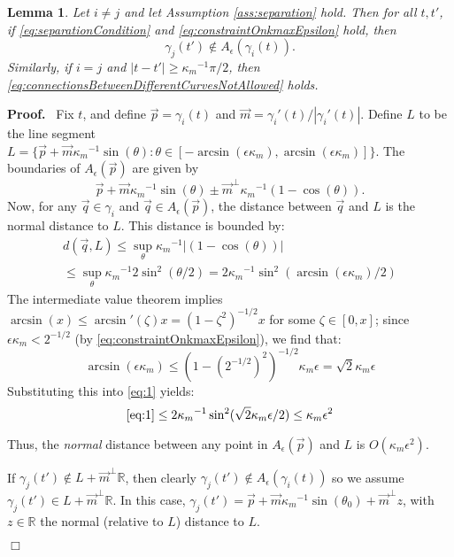\documentclass{article}
\newcommand{\nin}{\not\in}
\newenvironment{proof}{
  \noindent\textbf{Proof.}\ }{\hspace*{\fill}
  \begin{math}\Box\end{math}\medskip}
\newtheorem{lemma}[cntr]{Lemma}
\numberwithin{cntr}{section}
\numberwithin{equation}{section}
\newcommand{\abs}[1]{\left| #1 \right|}%
\newcommand{\RR}[0]{{\mathbb{R}}}
\newcommand{\vp}[0]{{\vec{p}}}
\newcommand{\vq}[0]{{\vec{q}}}
\newcommand{\vm}[0]{{\vec{m}}}
\newcommand{\allowed}[2]{ { A_{#1}(#2) } }
\newcommand{\kmax}{{\kappa_{m}}}
\newcommand{\kmaxi}{{\kmax^{-1}}}
\begin{document}
\begin{lemma}
  \label{lem:separationAllowedRegions}
  Let $i \neq j$ and let Assumption \ref{ass:separation} hold. Then for all $t, t'$, if \eqref{eq:separationCondition} and \eqref{eq:constraintOnkmaxEpsilon} hold, then
  \begin{equation}
    \label{eq:connectionsBetweenDifferentCurvesNotAllowed}
    \gamma_{j}(t')  \nin  \allowed{\epsilon}{\gamma_{i}(t)}.
  \end{equation}
  Similarly, if $i=j$ and $\abs{t-t'} \geq \kmax^{-1} \pi/2$, then \eqref{eq:connectionsBetweenDifferentCurvesNotAllowed} holds.
\end{lemma}
\begin{proof}
  Fix $t$, and define $\vp=\gamma_{i}(t)$ and $\vm=\gamma_{i}'(t) / \abs{\gamma_{i}'(t)}$. Define $L$ to be the line segment $L= \{ \vp+\vm \kmaxi \sin(\theta) : \theta \in [-\arcsin(\epsilon \kmax),\arcsin(\epsilon \kmax)] \}$. The boundaries of $\allowed{\epsilon}{\vp}$ are given by
\begin{equation*}
  \vp + \vm \kmaxi \sin(\theta) \pm \vm^{\perp} \kmaxi (1-\cos(\theta)).
\end{equation*}
Now, for any $\vq \in \gamma_{i} $ and $\vq \in \allowed{\epsilon}{\vp}$, the distance between $\vq$ and $L$ is the normal distance to $L$. This distance is bounded by:
\begin{multline}
  \label{eq:1}
  d(\vq,L) \leq
  \sup_{\theta} \kmaxi \abs{(1-\cos(\theta)) }\\
  \leq
  \sup_{\theta} \kmaxi 2 \sin^{2}(\theta/2) =
  2\kmaxi \sin^{2}( \arcsin(\epsilon \kmax)/2)
\end{multline}
The intermediate value theorem implies $\arcsin( x) \leq \arcsin'(\zeta) x=(1-\zeta^{2})^{-1/2} x$ for some $\zeta \in [0,x]$; since $\epsilon \kmax < 2^{-1/2}$ (by \eqref{eq:constraintOnkmaxEpsilon}), we find that:
\begin{equation*}
  \arcsin(\epsilon \kmax) \leq (1-(2^{-1/2})^{2})^{-1/2} \kmax \epsilon = \sqrt{2} \kmax \epsilon
\end{equation*}
Substituting this into \eqref{eq:1} yields:
\begin{equation}
  \eqref{eq:1} \leq  2 \kmaxi \sin^{2}( \sqrt{2} \kmax \epsilon/2) \leq \kmax \epsilon^{2}
\end{equation}

Thus, the \emph{normal} distance between any point in $\allowed{\epsilon}{\vp}$ and $L$ is $O(\kmax \epsilon^{2})$.

If $\gamma_{j}(t') \nin L+\vm^{\perp} \RR$, then clearly $\gamma_{j}(t') \nin \allowed{\epsilon}{\gamma_{i}(t)}$ so we assume $\gamma_{j}(t') \in L+\vm^{\perp} \RR$. In this case, $\gamma_{j}(t') = \vp + \vm \kmaxi \sin(\theta_{0}) + \vm^\perp z$, with $z \in \RR$ the normal (relative to $L$) distance to $L$.


\end{proof}
\end{document}

